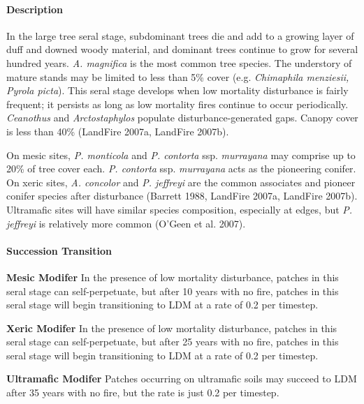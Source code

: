\paragraph{Description} In the large tree seral stage, subdominant trees die and add to a growing layer of duff and downed woody material, and dominant trees continue to grow for several hundred years. \emph{A. magnifica} is the most common tree species. The understory of mature stands may be limited to less than 5\% cover (e.g. \emph{Chimaphila menziesii, Pyrola picta}). This seral stage develops when low mortality disturbance is fairly frequent; it persists as long as low mortality fires continue to occur periodically. \emph{Ceanothus} and \emph{Arctostaphylos} populate disturbance-generated gaps. Canopy cover is less than 40\% (LandFire 2007a, LandFire 2007b).

On mesic sites, \emph{P. monticola} and \emph{P. contorta} ssp. \emph{murrayana} may comprise up to 20\% of tree cover each. \emph{P. contorta} ssp. \emph{murrayana} acts as the pioneering conifer. On xeric sites, \emph{A. concolor} and \emph{P. jeffreyi} are the common associates and pioneer conifer species after disturbance (Barrett 1988, LandFire 2007a, LandFire 2007b). Ultramafic sites will have similar species composition, especially at edges, but \emph{P. jeffreyi} is relatively more common (O’Geen et al. 2007).


\paragraph{Succession Transition}
\begin{adjustwidth}{2cm}{}
\textbf{Mesic Modifer } In the presence of low mortality disturbance, patches in this seral stage can self-perpetuate, but after 10 years with no fire, patches in this seral stage will begin transitioning to LDM at a rate of 0.2 per timestep.

\textbf{Xeric Modifer}  In the presence of low mortality disturbance, patches in this seral stage can self-perpetuate, but after 25 years with no fire, patches in this seral stage will begin transitioning to LDM at a rate of 0.2 per timestep.

\textbf{Ultramafic Modifer} Patches occurring on ultramafic soils may succeed to LDM after 35 years with no fire, but the rate is just 0.2 per timestep.

\end{adjustwidth}

